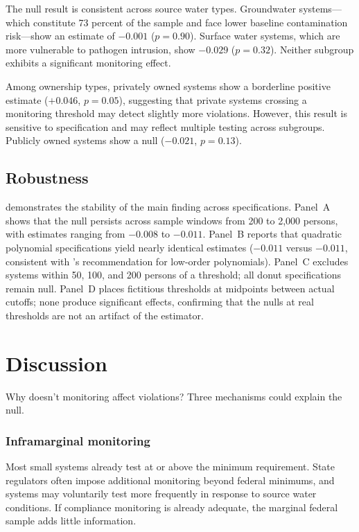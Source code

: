 \documentclass[12pt]{article}
\begin{document}
The null result is consistent across source water types. Groundwater systems---which constitute 73 percent of the sample and face lower baseline contamination risk---show an estimate of $-0.001$ ($p = 0.90$). Surface water systems, which are more vulnerable to pathogen intrusion, show $-0.029$ ($p = 0.32$). Neither subgroup exhibits a significant monitoring effect.

Among ownership types, privately owned systems show a borderline positive estimate ($+0.046$, $p = 0.05$), suggesting that private systems crossing a monitoring threshold may detect slightly more violations. However, this result is sensitive to specification and may reflect multiple testing across subgroups. Publicly owned systems show a null ($-0.021$, $p = 0.13$).

\subsection{Robustness}



 demonstrates the stability of the main finding across specifications. Panel~A shows that the null persists across sample windows from 200 to 2,000 persons, with estimates ranging from $-0.008$ to $-0.011$. Panel~B reports that quadratic polynomial specifications yield nearly identical estimates ($-0.011$ versus $-0.011$, consistent with \citealt{gelman2019high}'s recommendation for low-order polynomials). Panel~C excludes systems within 50, 100, and 200 persons of a threshold; all donut specifications remain null. Panel~D places fictitious thresholds at midpoints between actual cutoffs; none produce significant effects, confirming that the nulls at real thresholds are not an artifact of the estimator.


\section{Discussion}
\label{sec:discussion}

Why doesn't monitoring affect violations? Three mechanisms could explain the null.

\subsubsection*{Inframarginal monitoring} Most small systems already test at or above the minimum requirement. State regulators often impose additional monitoring beyond federal minimums, and systems may voluntarily test more frequently in response to source water conditions. If compliance monitoring is already adequate, the marginal federal sample adds little information.
\end{document}
